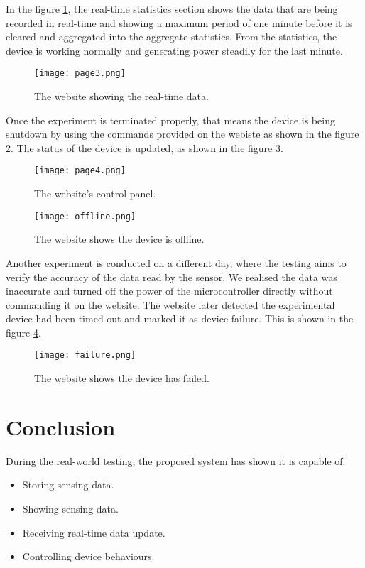 \documentclass[../thesis.tex]{subfiles}
\begin{document}
In the figure \ref{fig:page3}, the real-time statistics section shows the data that are being recorded in real-time and showing a maximum period of one minute before it is cleared and aggregated into the aggregate statistics. From the statistics, the device is working normally and generating power steadily for the last minute. 

\begin{figure}[!ht]
	\centering
	\texttt{[image: page3.png]}
	\caption{The website showing the real-time data.}
	\label{fig:page3}
\end{figure}


Once the experiment is terminated properly, that means the device is being shutdown by using the commands provided on the webiste as shown in the figure \ref{fig:page4}. The status of the device is updated, as shown in the figure \ref{fig:offline}. 

\begin{figure}[!ht]
	\centering
	\texttt{[image: page4.png]}
	\caption{The website's control panel.}
	\label{fig:page4}
\end{figure}

\begin{figure}[!ht]
	\centering
	\texttt{[image: offline.png]}
	\caption{The website shows the device is offline.}
	\label{fig:offline}
\end{figure}


Another experiment is conducted on a different day, where the testing aims to verify the accuracy of the data read by the sensor. We realised the data was inaccurate and turned off the power of the microcontroller directly without commanding it on the website. The website later detected the experimental device had been timed out and marked it as device failure. This is shown in the figure \ref{fig:failure}.


\begin{figure}[!ht]
	\centering
	\texttt{[image: failure.png]}
	\caption{The website shows the device has failed.}
	\label{fig:failure}
\end{figure}

\section{Conclusion}

During the real-world testing, the proposed system has shown it is capable of:

\begin{itemize}
	\item Storing sensing data.
	\item Showing sensing data.
	\item Receiving real-time data update.
	\item Controlling device behaviours.
\end{itemize}
\end{document}
